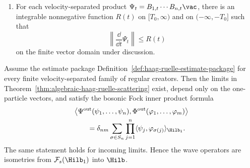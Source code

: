 \begin{definition}
\begin{enumerate}
\begin{equation}
  \begin{aligned}
  &
  \left\langle
    B_{1,t}\cdots B_{n,t}\vac,
    C_{1,t}\cdots C_{m,t}\vac
  \right\rangle
  \\
  &\quad =
  \sum_{\ell=1}^{m}
  \langle\psi_1,\varphi_\ell\rangle
  \left\langle
    B_{2,t}\cdots B_{n,t}\vac,
    C_{1,t}\cdots \widehat{C_{\ell,t}}\cdots C_{m,t}\vac
  \right\rangle
  +O_N((1+|t|)^{-N})
  \end{aligned}
  \label{eq:hr-estimate-package-recursive-contraction}
  \end{equation}
  for every \(N\ge1\), with the convention that the sum is empty when
  \(m=0\).
  \item For each velocity-separated product
  \(\Psi_t=B_{1,t}\cdots B_{n,t}\vac\), there is an integrable nonnegative
  function \(R(t)\) on \([T_0,\infty)\) and on
  \((-\infty,-T_0]\) such that
  \begin{equation}
    \left\|\frac{\dd}{\dd t}\Psi_t\right\|\le R(t)
    \label{eq:hr-estimate-package-cook}
  \end{equation}
  on the finite vector domain under discussion.
\end{enumerate}
\end{definition}

\begin{proposition}
\label{prop:estimate-package-implies-haag-ruelle}
Assume the estimate package
Definition~\ref{def:haag-ruelle-estimate-package} for every finite
velocity-separated family of regular creators.  Then the limits in
Theorem~\ref{thm:algebraic-haag-ruelle-scattering} exist, depend only on the
one-particle vectors, and satisfy the bosonic Fock inner product formula
\begin{equation}
\begin{aligned}
&
\left\langle
  \Psi^{\rm out}(\psi_1,\ldots,\psi_n),
  \Phi^{\rm out}(\varphi_1,\ldots,\varphi_m)
\right\rangle
\\
&\qquad
=
\delta_{nm}
\sum_{\sigma\in S_n}
\prod_{j=1}^{n}
\langle\psi_j,\varphi_{\sigma(j)}\rangle_{\Hilb_1}.
\end{aligned}
\label{eq:hr-fock-inner-product-from-estimates}
\end{equation}
The same statement holds for incoming limits.  Hence the wave operators are
isometries from \(\mathcal F_s(\Hilb_1)\) into \(\Hilb\).
\end{proposition}

